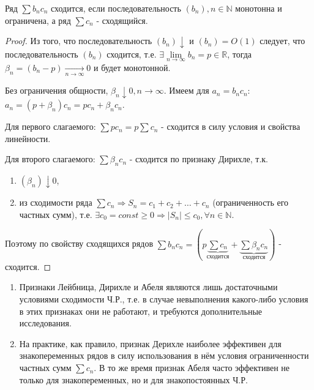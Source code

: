 \begin{theorem}
	Ряд $\sum b_n c_n$ сходится, если последовательность $\left( b_n \right), n \in \mathbb{N}$ монотонна и ограничена, а ряд $\sum c_n$ - сходящийся.
\end{theorem}
\begin{proof}
	Из того, что последовательность $ \left( b_n \right) \downarrow$ и $\left( b_n \right) = O(1)$ следует, что последовательность $\left( b_n \right)$ сходится, т.е. $\exists \lim\limits_{n \to \infty} b_n = p \in \mathbb{R}$, тогда $\beta_n = (b_n - p) \xrightarrow[n \to \infty]{} 0$ и будет монотонной.
	
	Без ограничения общности, $\beta_n \downarrow 0, n \to \infty$. Имеем для $a_n = b_n c_n$:\\
	$a_n = (p + \beta_n) c_n = p c_n + \beta_n c_n$.
	
	Для первого слагаемого: $\sum p c_n = p \sum c_n$ - сходится в силу условия и свойства линейности.
	
	Для второго слагаемого: $\sum \beta_n c_n$ - сходится по признаку Дирихле, т.к.
	\begin{enumerate}
		\item $\left( \beta_n \right) \downarrow 0$,
		\item из сходимости ряда $\sum c_n \Rightarrow S_n = c_1 + c_2 + \ldots + c_n$ (ограниченность его частных сумм), т.е. $\exists c_0 = const \geqslant 0 \Rightarrow|S_n| \leqslant c_0, \forall n \in \mathbb{N}$.
	\end{enumerate}
	Поэтому по свойству сходящихся рядов $\sum b_n c_n = \left( p \underbrace{ \sum c_n}_{\text{сходится}} + \underbrace{ \sum \beta_n c_n}_{\text{сходится}} \right)$ - сходится. 
\end{proof}
\begin{note}
	\begin{enumerate}
		\item Признаки Лейбница, Дирихле и Абеля являются лишь достаточными условиями сходимости Ч.Р., т.е. в случае невыполнения какого-либо условия в этих признаках они не работают, и требуются дополнительные исследования.\\
		\item На практике, как правило, признак Дерихле наиболее эффективен для знакопеременных рядов в силу использования в нём условия ограниченности частных сумм $\sum c_n$. В то же время признак Абеля часто эффективен не только для знакопеременных, но и для знакопостоянных Ч.Р.
	\end{enumerate}
\end{note}